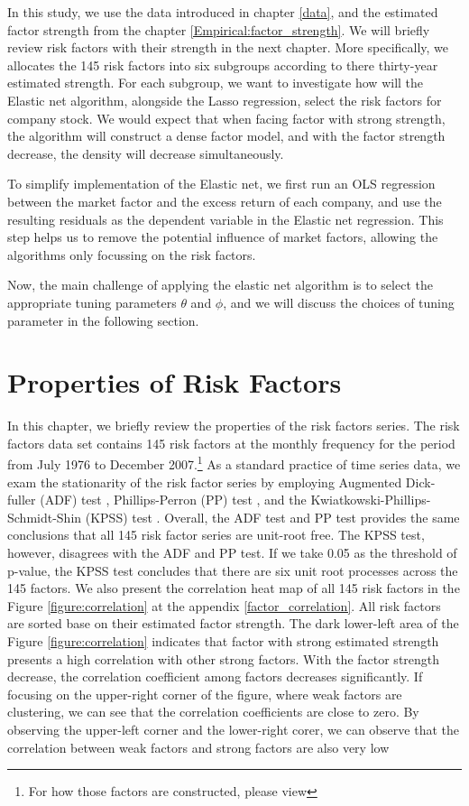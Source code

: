 In this study, we use the data introduced in chapter \ref{data}, and the estimated factor strength from the chapter \ref{Empirical:factor_strength}.
We will briefly review risk factors with their strength in the next chapter.
More specifically, we allocates the 145 risk factors into six subgroups according to there thirty-year estimated strength.
For each subgroup, we want to investigate how will the Elastic net algorithm, alongside the Lasso regression, select the risk factors for company stock.
We would expect that when facing factor with strong strength, the algorithm will construct a dense factor model, and with the factor strength decrease, the density will decrease simultaneously.

To simplify implementation of the Elastic net, we first run an OLS regression between the market factor and the excess return of each company, and use the resulting residuals as the dependent variable in the Elastic net regression.
This step helps us to remove the potential influence of market factors, allowing the algorithms only focussing on the risk factors. 

Now, the main challenge of applying the elastic net algorithm is to select the appropriate tuning parameters $\theta$ and $\phi$, and we will discuss the choices of tuning parameter in the following section.

\section{Properties of Risk Factors}
In this chapter, we briefly review the properties of the risk factors series. 
The risk factors data set contains 145 risk factors at the monthly frequency for the period from July 1976 to December 2007.\footnote{For how those factors are constructed, please view }
As a standard practice of time series data, we exam the stationarity of the risk factor series by employing Augmented Dick-fuller (ADF) test  \cite{Dickey1979},  Phillips-Perron (PP) test \cite{Phillips1988}, and the Kwiatkowski-Phillips-Schmidt-Shin (KPSS) test \cite{Kwiatkowski1992}.
Overall, the ADF test and PP test provides the same conclusions that all 145 risk factor series are unit-root free.
The KPSS test, however, disagrees with the ADF and PP test.
If we take 0.05 as the threshold of p-value, the KPSS test concludes that there are six unit root processes across the 145 factors.
We also present the correlation heat map of all 145 risk factors in the Figure \ref{figure:correlation} at the appendix \ref{factor_correlation}.
All risk factors are sorted base on their estimated factor strength.
The dark lower-left area of the Figure \ref{figure:correlation} indicates that factor with strong estimated strength presents a high correlation with other strong factors.
With the factor strength decrease, the correlation coefficient among factors decreases significantly.
If focusing on the upper-right corner of the figure, where weak factors are clustering, we can see that the correlation coefficients are close to zero.
By observing the upper-left corner and the lower-right corer, we can observe that the correlation between weak factors and strong factors are also very low


